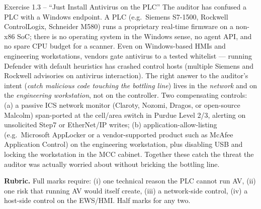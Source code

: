 \documentclass[11pt,a4paper]{article}
\begin{document}
\begin{solutionbox}{Exercise 1.3 -- ``Just Install Antivirus on the PLC''}
The auditor has confused a PLC with a Windows endpoint. A PLC (e.g.\ Siemens S7-1500, Rockwell ControlLogix, Schneider M580) runs a proprietary real-time firmware on a non-x86 SoC; there is no operating system in the Windows sense, no agent API, and no spare CPU budget for a scanner. Even on Windows-based HMIs and engineering workstations, vendors gate antivirus to a tested whitelist --- running Defender with default heuristics has crashed control hosts (multiple Siemens and Rockwell advisories on antivirus interaction). The right answer to the auditor's intent (\emph{catch malicious code touching the bottling line}) lives in the \emph{network} and on the \emph{engineering workstation}, not on the controller. Two compensating controls: (a) a passive ICS network monitor (Claroty, Nozomi, Dragos, or open-source Malcolm) span-ported at the cell/area switch in Purdue Level 2/3, alerting on unsolicited Step7 or EtherNet/IP writes; (b) application-allow-listing (e.g.\ Microsoft AppLocker or a vendor-supported product such as McAfee Application Control) on the engineering workstation, plus disabling USB and locking the workstation in the MCC cabinet. Together these catch the threat the auditor was actually worried about without bricking the bottling line.

\textbf{Rubric.} Full marks require: (i) one technical reason the PLC cannot run AV, (ii) one risk that running AV would itself create, (iii) a network-side control, (iv) a host-side control on the EWS/HMI. Half marks for any two.
\end{solutionbox}
\end{document}
